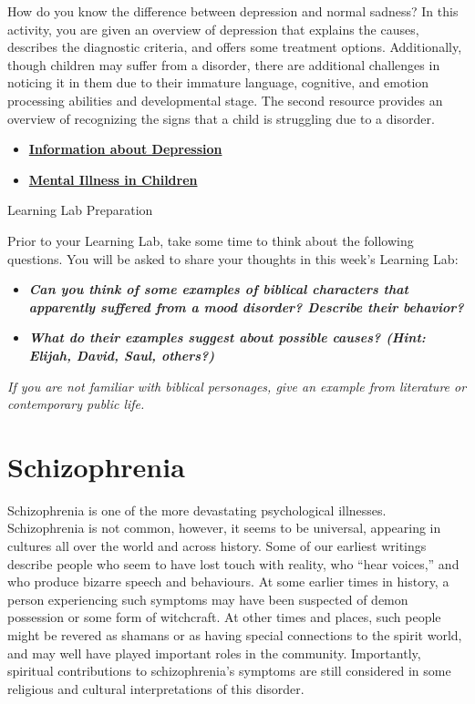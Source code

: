 \documentclass[
]{book}
\providecommand{\tightlist}{%
  \setlength{\itemsep}{0pt}\setlength{\parskip}{0pt}}
\begin{document}
\begin{reflect}
How do you know the difference between depression and normal sadness? In this activity, you are given an overview of depression that explains the causes, describes the diagnostic criteria, and offers some treatment options. Additionally, though children may suffer from a disorder, there are additional challenges in noticing it in them due to their immature language, cognitive, and emotion processing abilities and developmental stage. The second resource provides an overview of recognizing the signs that a child is struggling due to a disorder.

\begin{itemize}
\tightlist
\item
  \href{https://psychologyinfo.com/}{\textbf{Information about Depression}}\\
\item
  \href{https://www.mayoclinic.org/healthy-lifestyle/childrens-health/in-depth/mental-illness-in-children/art-20046577}{\textbf{Mental Illness in Children}}
\end{itemize}

{Learning Lab Preparation}

Prior to your Learning Lab, take some time to think about the following questions. You will be asked to share your thoughts in this week's Learning Lab:

\begin{itemize}
\tightlist
\item
  \textbf{\emph{Can you think of some examples of biblical characters that apparently suffered from a mood disorder? Describe their behavior?}}\\
\item
  \textbf{\emph{What do their examples suggest about possible causes? (Hint: Elijah, David, Saul, others?)}}
\end{itemize}

\emph{If you are not familiar with biblical personages, give an example from literature or contemporary public life.}
\end{reflect}

\hypertarget{schizophrenia}{%
\section{Schizophrenia}\label{schizophrenia}}

Schizophrenia is one of the more devastating psychological illnesses. Schizophrenia is not common, however, it seems to be universal, appearing in cultures all over the world and across history. Some of our earliest writings describe people who seem to have lost touch with reality, who ``hear voices,'' and who produce bizarre speech and behaviours. At some earlier times in history, a person experiencing such symptoms may have been suspected of demon possession or some form of witchcraft. At other times and places, such people might be revered as shamans or as having special connections to the spirit world, and may well have played important roles in the community. Importantly, spiritual contributions to schizophrenia's symptoms are still considered in some religious and cultural interpretations of this disorder.
\end{document}
